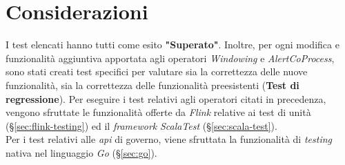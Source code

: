 \section{Considerazioni}
I test elencati hanno tutti come esito \textbf{"Superato"}. Inoltre, per ogni modifica e funzionalità aggiuntiva apportata agli operatori \textit{Windowing} e \textit{AlertCoProcess}, sono stati creati test specifici per valutare sia la correttezza delle nuove funzionalità, sia la correttezza delle funzionalità preesistenti (\textbf{Test di regressione}). Per eseguire i test relativi agli operatori citati in precedenza, vengono sfruttate le funzionalità offerte da \textit{Flink} relative ai test di unità (\S\ref{sec:flink-testing}) ed il \textit{\textit{\gls{framework}}} \textit{ScalaTest} (\S\ref{sec:scala-test}).\\
Per i test relativi alle \textit{\gls{api}} di governo, viene sfruttata la funzionalità di \textit{testing} nativa nel linguaggio \textit{Go} (\S\ref{sec:go}).